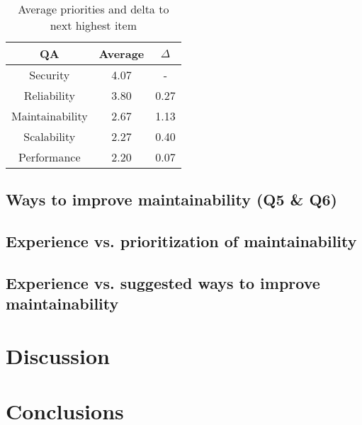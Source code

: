 \documentclass[utf8,english]{gradu3}
\begin{document}
\begin{table}[!h]
  \begin{center}
    \caption{Average priorities and delta to next highest item}
    \label{table:priorities3}
    \begin{tabular}{|c|c|c|}
      \hline
      \textbf{QA} & \textbf{Average} & \textbf{$\Delta$} \\
      \hline
      Security & 4.07 & -\\
      Reliability & 3.80 & 0.27\\
      Maintainability & 2.67 & 1.13\\
      Scalability & 2.27 & 0.40\\
      Performance & 2.20 & 0.07\\
      \hline
    \end{tabular}
  \end{center}
\end{table}
      
\section{Ways to improve maintainability (Q5 \& Q6)}

\section{Experience vs. prioritization of maintainability}

\section{Experience vs. suggested ways to improve maintainability}


\chapter{Discussion}


\chapter{Conclusions}


\printbibliography

\nocite{*}

\appendix
\end{document}
